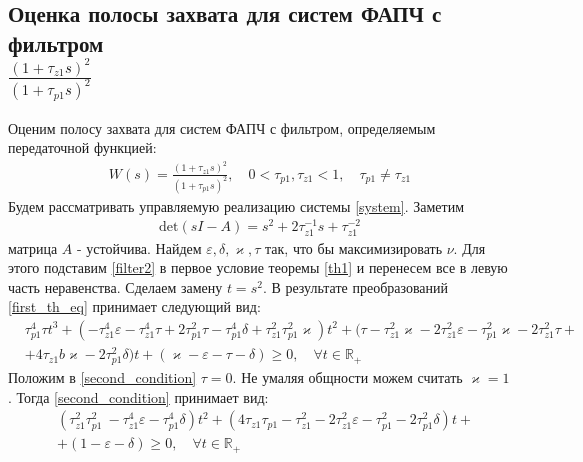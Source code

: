 \documentclass[a4paper,14pt]{article} %
\theoremstyle{cited}
\begin{document}
\subsection{Оценка полосы захвата для систем ФАПЧ с фильтром \\ $\frac{(1+\tau_{z1}s)^2}{(1+\tau_{p1}s)^2}$}
Оценим полосу захвата для систем ФАПЧ с фильтром, определяемым передаточной функцией:
 \begin{equation}\label{filter2}
 \begin{aligned}
W(s) = \frac{(1+\tau_{z1}s)^2}{(1+\tau_{p1}s)^2}, \quad 0<\tau_{p1},\tau_{z1} < 1, \quad \tau_{p1} \neq \tau_{z1}
 \end{aligned}
\end{equation}
Будем рассматривать управляемую реализацию системы \eqref{system}. Заметим
 \begin{equation}
 \begin{aligned}
\text{det}(sI-A) = s^2 + 2\tau_{z1}^{-1}s + \tau_{z1}^{-2}
 \end{aligned}
\end{equation}
матрица $A$ - устойчива. Найдем $\varepsilon, \delta, \varkappa, \tau$ так, что бы максимизировать $\nu$. Для этого подставим \eqref{filter2} в первое условие теоремы \ref{th1} и перенесем все в левую часть неравенства. Сделаем замену $t = s^2$. В результате преобразований \eqref{first_th_eq} принимает следующий вид:
 \begin{equation}\label{second_condition}
 \begin{aligned}
&\tau_{p1}^4\tau t^3 +(- \tau_{z1}^4\varepsilon - \tau_{z1}^4\tau + 2\tau_{p1}^2\tau- \tau_{p1}^4\delta + \tau_{z1}^2\tau_{p1}^2\varkappa)t^2 +( \tau- \tau_{z1}^2\varkappa - 2\tau_{z1}^2\varepsilon - \tau_{p1}^2\varkappa- 2\tau_{z1}^2\tau+ \\
&+ 4\tau_{z1}b\varkappa- 2\tau_{p1}^2\delta)t + (\varkappa-\varepsilon - \tau - \delta)  \geqslant 0, \quad \forall t \in \mathbb{R_+}
 \end{aligned}
\end{equation}
Положим в \eqref{second_condition} $\tau = 0$. Не умаляя общности можем считать $\varkappa = 1$. Тогда \eqref{second_condition} принимает вид:
 \begin{equation}\label{second_condition_tau_zero}
 \begin{aligned}
&(\tau_{z1}^2\tau_{p1}^2\ - \tau_{z1}^4\varepsilon - \tau_{p1}^4\delta)t^2 +( 4\tau_{z1}\tau_{p1} - \tau_{z1}^2 - 2\tau_{z1}^2\varepsilon - \tau_{p1}^2 - 2\tau_{p1}^2\delta)t + \\
&+ (1-\varepsilon - \delta)  \geqslant 0, \quad \forall t \in \mathbb{R_+}
 \end{aligned}
\end{equation}
\end{document}

